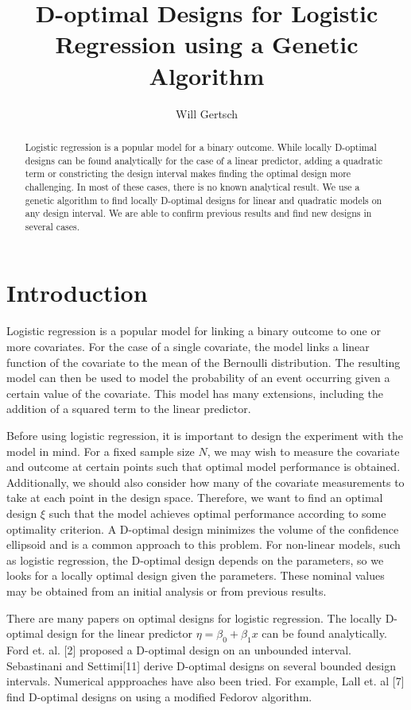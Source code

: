 \documentclass[11pt,a4paper]{article}
\title{D-optimal Designs for Logistic Regression using a Genetic Algorithm}
\author{Will Gertsch}
\begin{document}
\maketitle

\begin{abstract}
Logistic regression is a popular model for a binary outcome. While locally D-optimal designs can be found analytically for the case of a linear predictor, adding a quadratic term or constricting the design interval makes finding the optimal design more challenging. In most of these cases, there is no known analytical result. We use  a genetic algorithm to find locally D-optimal designs for linear and quadratic models on any design interval. We are able to confirm previous results and find new designs in several cases. 
\end{abstract}

\section{Introduction}
Logistic regression is a popular model for linking a binary outcome to one or more covariates. For the case of a single covariate, the model links a linear function of the covariate to the mean of the Bernoulli distribution. The resulting model can then be used to model the probability of an event occurring given a certain value of the covariate. This model has many extensions, including the addition of a squared term to the linear predictor.

Before using logistic regression, it is important to design the experiment with the model in mind. For a fixed sample size $N$, we may wish to measure the covariate and outcome at certain points such that optimal model performance is obtained. Additionally, we should also consider how many of the covariate measurements to take at each point in the design space. Therefore, we want to find an optimal design $\xi$ such that the model achieves optimal performance according to some optimality criterion. A D-optimal design minimizes the volume of the confidence ellipsoid and is a common approach to this problem. For non-linear models, such as logistic regression, the D-optimal design depends on the parameters, so we looks for a locally optimal design given the parameters. These nominal values may be obtained from an initial analysis or from previous results.

There are many papers on optimal designs for logistic regression. The locally D-optimal design for the linear predictor $\eta = \beta_0 + \beta_1 x$ can be found analytically. Ford et. al. [2] proposed a D-optimal design on an unbounded interval. Sebastinani and Settimi[11] derive D-optimal designs on several bounded design intervals. Numerical appproaches have also been tried. For example, Lall et. al [7] find D-optimal designs on using a modified Fedorov algorithm.
\end{document}
